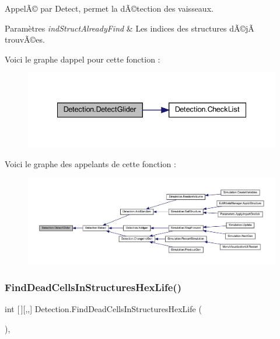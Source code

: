 AppelÃ© par Detect, permet la dÃ©tection des vaisseaux. 


\begin{DoxyParams}{Paramètres}
{\em ind\+Struct\+Already\+Find} & Les indices des structures dÃ©jÃ  trouvÃ©es.\\
\hline
\end{DoxyParams}
Voici le graphe d\textquotesingle{}appel pour cette fonction \+:
\nopagebreak
\begin{figure}[H]
\begin{center}
\leavevmode
\includegraphics[width=335pt]{class_detection_a88c0afc7566ffe8ac32fe1c21da192df_cgraph}
\end{center}
\end{figure}
Voici le graphe des appelants de cette fonction \+:
\nopagebreak
\begin{figure}[H]
\begin{center}
\leavevmode
\includegraphics[width=350pt]{class_detection_a88c0afc7566ffe8ac32fe1c21da192df_icgraph}
\end{center}
\end{figure}
\mbox{\label{class_detection_ac836468018dc40fd2261136a035eb25a}} 
\subsubsection{\texorpdfstring{Find\+Dead\+Cells\+In\+Structures\+Hex\+Life()}{FindDeadCellsInStructuresHexLife()}}
{\footnotesize\ttfamily int \mbox{[}$\,$\mbox{]}\mbox{[},,\mbox{]} Detection.\+Find\+Dead\+Cells\+In\+Structures\+Hex\+Life (\begin{DoxyParamCaption}{ }\end{DoxyParamCaption})\hspace{0.3cm}{\ttfamily [inline]}, {\ttfamily [private]}}



